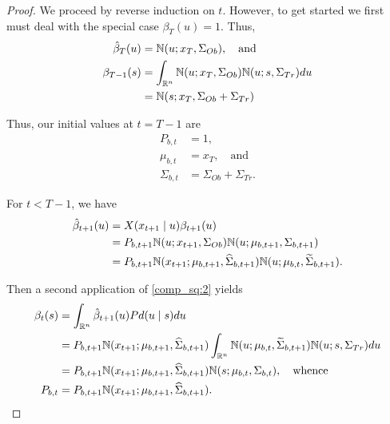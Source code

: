 \documentclass[12pt,leqno]{article}
\begin{document}
\begin{proof}
  We proceed by reverse induction on $t$. However, to get started we first must  deal with
  the special case $\beta_{T}(u) = 1$.  Thus,
  \begin{align*}
    \hat{\beta}_T(u) &= {\mathbb N}(u;x_T,\Sigma_{Ob}),\quad\text{and}\\
    \beta_{T-1}(s) &= \int_{{\mathbb R}^n}{\mathbb N}(u;x_T,\Sigma_{Ob}){\mathbb N}(u;s,\Sigma_{Tr})du \\
    &= {\mathbb N}(s;x_T,\Sigma_{Ob}+\Sigma_{Tr})
  \end{align*}

  Thus, our initial values at $t = T-1$ are
  \begin{align*}
  P_{b,t} &= 1,\\
  \mu_{b,t} &= x_T, \quad\text{and}\\
  \Sigma_{b,t} &= \Sigma_{Ob}+\Sigma_{Tr}.
  \end{align*}

  For $t <  T-1$, we have 
  \begin{align*}
    \hat{\beta}_{t+1}(u) &= X(x_{t+1}\mid u)\beta_{t+1}(u)\\
    &= P_{b,t+1}{\mathbb N}(u;x_{t+1},\Sigma_{Ob}){\mathbb N}(u;\mu_{b,t+1},\Sigma_{b,t+1})\\
    &= P_{b,t+1}{\mathbb N}(x_{t+1};\mu_{b,t+1},\widehat{\Sigma}_{b,t+1}){\mathbb N}(u;\mu_{b,t},\widetilde{\Sigma}_{b,t+1}).
  \end{align*}

  Then a second application of \eqref{comp_sq:2} yields
  \begin{align*}
    \beta_t(s) &= \int_{{\mathbb R}^n}\hat{\beta}_{t+1}(u)Pd(u\mid s)du \\
    &= P_{b,t+1}{\mathbb N}(x_{t+1};\mu_{b,t+1},\widehat{\Sigma}_{b,t+1})\int_{{\mathbb R}^n}{\mathbb N}(u;\mu_{b,t},\widetilde{\Sigma}_{b,t+1}){\mathbb N}(u;s,\Sigma_{Tr})du\\
    &=P_{b,t+1}{\mathbb N}(x_{t+1};\mu_{b,t+1},\widehat{\Sigma}_{b,t+1}){\mathbb N}(s;\mu_{b,t},\Sigma_{b,t}),\quad\text{whence}\\
    P_{b,t} &= P_{b,t+1}{\mathbb N}(x_{t+1};\mu_{b,t+1},\widehat{\Sigma}_{b,t+1}).
  \end{align*}
\end{proof}
\end{document}
